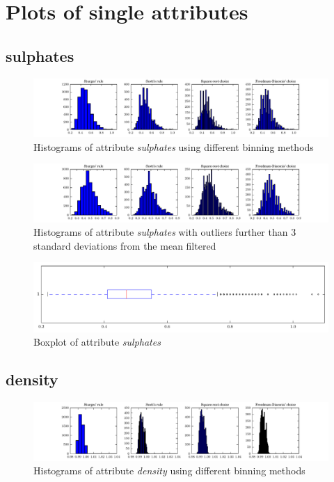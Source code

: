\documentclass{report}
\begin{document}
\section{Plots of single attributes}

\subsection{sulphates}
\begin{figure}[H]
\includegraphics[width=\textwidth]{histograms/sulphates.pdf}
\caption{Histograms of attribute \emph{sulphates} using different binning methods}\end{figure}

\begin{figure}[H]
\includegraphics[width=\textwidth]{histograms/sulphates_filtered.pdf}
\caption{Histograms of attribute \emph{sulphates} with outliers further than 3 standard deviations from the mean filtered}
\end{figure}

\begin{figure}[H]
\includegraphics[width=\textwidth]{boxplots/sulphates.pdf}
\caption{Boxplot of attribute \emph{sulphates}}\end{figure}

\newpage\subsection{density}
\begin{figure}[H]
\includegraphics[width=\textwidth]{histograms/density.pdf}
\caption{Histograms of attribute \emph{density} using different binning methods}\end{figure}
\end{document}
